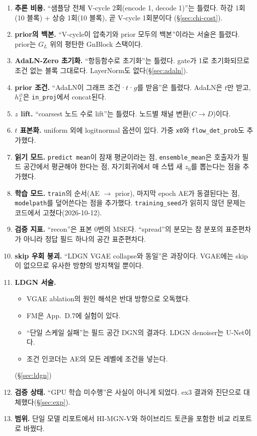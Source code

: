 \documentclass[11pt]{article}
\newcommand{\code}[1]{\texttt{#1}}
\begin{document}
\begin{enumerate}
\item \textbf{추론 비용.} ``샘플당 전체 V-cycle 2회(encode 1, decode 1)''는
  틀렸다. 하강 1회(10 블록) + 상승 1회(10 블록), 곧 V-cycle 1회분이다
  (\S\ref{sec:chi-cost}).
\item \textbf{prior의 백본.} ``V-cycle이 압축기와 prior 모두의 백본''이라는
  서술은 틀렸다. prior는 $G_L$ 위의 평탄한 GnBlock 스택이다.
\item \textbf{AdaLN-Zero 초기화.} ``항등함수로 초기화''는 틀렸다. gate가 1로
  초기화되므로 조건 없는 블록 그대로다. LayerNorm도 없다(\S\ref{sec:adaln}).
\item \textbf{prior 조건.} ``AdaLN이 그래프 조건·$t$·$g$를 받음''은 틀렸다.
  AdaLN은 $t$만 받고, $h_L^{\varnothing}$은 \code{in\_proj}에서 concat된다.
\item \textbf{$z$ lift.} ``coarsest 노드 수로 lift''는 틀렸다. 노드별 채널
  변환($C\to D$)이다.
\item \textbf{$t$ 표본화.} uniform 외에 logitnormal 옵션이 있다. 가중
  \code{x0}와 \code{flow\_det\_prob}도 추가했다.
\item \textbf{읽기 모드.} \code{predict mean}이 잠재 평균이라는 점,
  \code{ensemble\_mean}은 호출자가 필드 공간에서 평균해야 한다는 점,
  자기회귀에서 매 스텝 새 $z_0$를 뽑는다는 점을 추가했다.
\item \textbf{학습 모드.} \code{train}의 순서(AE $\to$ prior), 마지막 epoch AE가
  동결된다는 점, \code{modelpath}를 덮어쓴다는 점을 추가했다. \code{training\_seed}가
  읽히지 않던 문제는 코드에서 고쳤다(2026-10-12).
\item \textbf{검증 지표.} ``recon''은 표본 0번의 MSE다. ``spread''의 분모는
  참 분포의 표준편차가 아니라 정답 필드 하나의 공간 표준편차다.
\item \textbf{skip 우회 붕괴.} ``LDGN VGAE collapse와 동일''은 과장이다.
  VGAE에는 skip이 없으므로 유사한 방향의 방지책일 뿐이다.
\item \textbf{LDGN 서술.}
  \begin{itemize}
  \item VGAE ablation의 원인 해석은 반대 방향으로 오독했다.
  \item FM은 App.~D.7에 실험이 있다.
  \item ``단일 스케일 실패''는 필드 공간 DGN의 결과다. LDGN denoiser는 U-Net이다.
  \item 조건 인코더는 AE의 모든 레벨에 조건을 넣는다.
  \end{itemize}
  (\S\ref{sec:ldgn})
\item \textbf{검증 상태.} ``GPU 학습 미수행''은 사실이 아니게 되었다. ex3 결과와
  진단으로 대체했다(\S\ref{sec:exp}).
\item \textbf{범위.} 단일 모델 리포트에서 HI-MGN-V와 하이브리드 토큰을
  포함한 비교 리포트로 바꿨다.
\end{enumerate}
\end{document}
